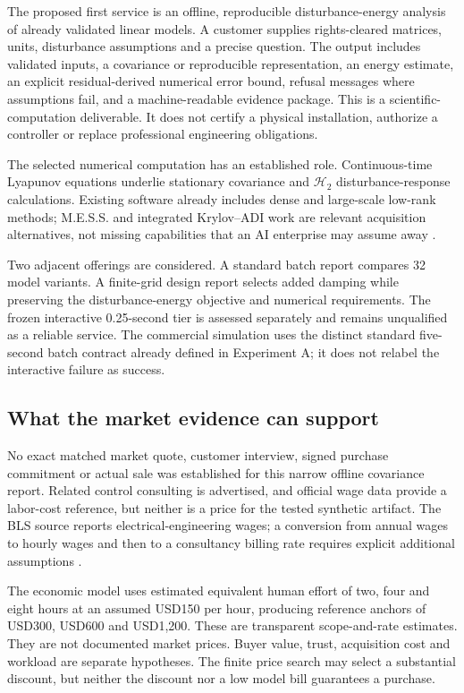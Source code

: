 \documentclass[11pt,letterpaper]{article}
\begin{document}
The proposed first service is an offline, reproducible disturbance-energy analysis of already validated linear models. A customer supplies rights-cleared matrices, units, disturbance assumptions and a precise question. The output includes validated inputs, a covariance or reproducible representation, an energy estimate, an explicit residual-derived numerical error bound, refusal messages where assumptions fail, and a machine-readable evidence package. This is a scientific-computation deliverable. It does not certify a physical installation, authorize a controller or replace professional engineering obligations.

The selected numerical computation has an established role. Continuous-time Lyapunov equations underlie stationary covariance and $\mathcal H_2$ disturbance-response calculations. Existing software already includes dense and large-scale low-rank methods; M.E.S.S. and integrated Krylov--ADI work are relevant acquisition alternatives, not missing capabilities that an AI enterprise may assume away \cite{scipy,mess,krylov,mathworks}.

Two adjacent offerings are considered. A standard batch report compares 32 model variants. A finite-grid design report selects added damping while preserving the disturbance-energy objective and numerical requirements. The frozen interactive 0.25-second tier is assessed separately and remains unqualified as a reliable service. The commercial simulation uses the distinct standard five-second batch contract already defined in Experiment A; it does not relabel the interactive failure as success.

\subsection{What the market evidence can support}

No exact matched market quote, customer interview, signed purchase commitment or actual sale was established for this narrow offline covariance report. Related control consulting is advertised, and official wage data provide a labor-cost reference, but neither is a price for the tested synthetic artifact. The BLS source reports electrical-engineering wages; a conversion from annual wages to hourly wages and then to a consultancy billing rate requires explicit additional assumptions \cite{bls,apics}.

The economic model uses estimated equivalent human effort of two, four and eight hours at an assumed USD150 per hour, producing reference anchors of USD300, USD600 and USD1,200. These are transparent scope-and-rate estimates. They are not documented market prices. Buyer value, trust, acquisition cost and workload are separate hypotheses. The finite price search may select a substantial discount, but neither the discount nor a low model bill guarantees a purchase.
\end{document}
